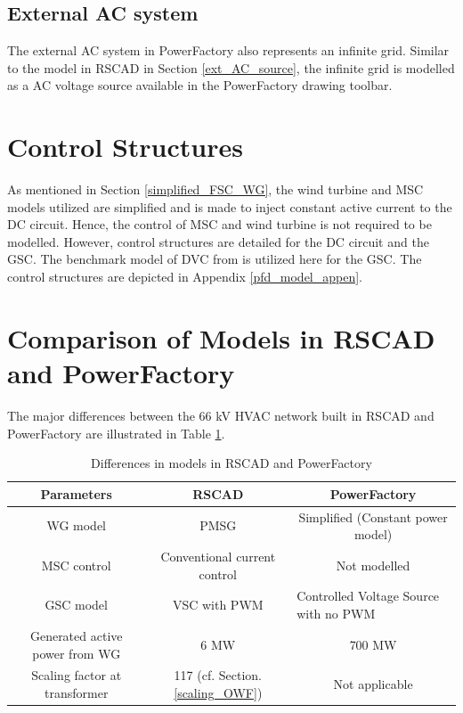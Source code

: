 \subsection{External AC system}
The external \gls{AC} system in PowerFactory also represents an infinite grid. Similar to the model in RSCAD in Section \ref{ext_AC_source}, the infinite grid is modelled as a \gls{AC} voltage source available in the PowerFactory drawing toolbar. 

\section{Control Structures}
As mentioned in Section \ref{simplified_FSC_WG}, the wind turbine and \gls{MSC} models utilized are simplified and is made to inject constant active current to the \gls{DC} circuit. Hence, the control of \gls{MSC} and wind turbine is not required to be modelled. However, control structures are detailed for the \gls{DC} circuit and the \gls{GSC}. The benchmark model of \gls{DVC} from \cite{erlich_description_2018} is utilized here for the \gls{GSC}. The control structures are depicted in Appendix \ref{pfd_model_appen}.      

\section{Comparison of Models in RSCAD and PowerFactory }
The major differences between the 66 kV \gls{HVAC} network built in RSCAD and PowerFactory are illustrated in Table \ref{tab:Comp_RSCAD_PFD_Para}. 
\vspace{-1mm}
\begingroup
\renewcommand{\arraystretch}{1.2} %
\begin{table}[H]
\centering
\begin{tabular}{|c|c|c|}
\hline
\textbf{Parameters}   & \textbf{RSCAD}         & \textbf{PowerFactory}             \\ \hline
WG model      & PMSG   & Simplified (Constant power model)                                \\ \hline
MSC control   & Conventional current control     & Not modelled           \\ \hline
GSC model & {VSC with PWM} & \multicolumn{1}{l|}{Controlled Voltage Source with no PWM}  \\ \hline
Generated active power from WG  & 6 MW  & 700 MW                                    \\ \hline
Scaling factor at transformer & 117 (cf. Section. \ref{scaling_OWF}) & Not applicable                           \\ \hline
\end{tabular}
\caption{Differences in models in RSCAD and PowerFactory}
\label{tab:Comp_RSCAD_PFD_Para}
\end{table}
\endgroup

